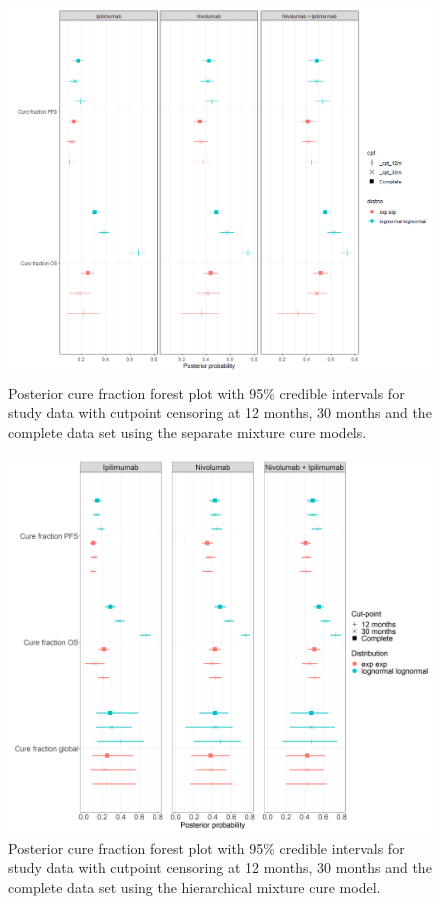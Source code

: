 \documentclass[AMA,STIX1COL]{WileyNJD-v2}
\begin{document}
\begin{figure}[!H]
\centering
\includegraphics[height=10cm, width=0.6\linewidth]{forest_plot_cf_sep_cpt.png}
\caption{\label{fig:forest_plot_cf_cutpoint_sep} Posterior cure fraction forest plot with 95\% credible intervals for study data with cutpoint censoring at 12 months, 30 months and the complete data set using the separate mixture cure models.}
\end{figure}

\begin{figure}[!H]
\centering
\includegraphics[height=10cm, width=0.6\linewidth]{forest_plot_cf_hier_cpt.png}
\caption{\label{fig:forest_plot_cf_cutpoint_hier} Posterior cure fraction forest plot with 95\% credible intervals for study data with cutpoint censoring at 12 months, 30 months and the complete data set using the hierarchical mixture cure model.}
\end{figure}
\end{document}
